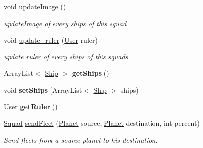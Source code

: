 \begin{DoxyCompactItemize}
\mbox{\label{classfr_1_1groupe40_1_1projet_1_1model_1_1ships_1_1_squad_ae76aa52a5a5892f28e2b5a89ccc98fa6}} 
void \mbox{\hyperlink{classfr_1_1groupe40_1_1projet_1_1model_1_1ships_1_1_squad_ae76aa52a5a5892f28e2b5a89ccc98fa6}{update\+Image}} ()
\begin{DoxyCompactList}\small\item\em update\+Image of every ships of this squad \end{DoxyCompactList}\item 
void \mbox{\hyperlink{classfr_1_1groupe40_1_1projet_1_1model_1_1ships_1_1_squad_adaf147d0fd3649c1bf3172c9fd77f096}{update\+\_\+ruler}} (\mbox{\hyperlink{classfr_1_1groupe40_1_1projet_1_1client_1_1_user}{User}} ruler)
\begin{DoxyCompactList}\small\item\em update ruler of every ships of this squads \end{DoxyCompactList}\item 
\mbox{\label{classfr_1_1groupe40_1_1projet_1_1model_1_1ships_1_1_squad_a1f5eb0f3d75a52d9f9aeb356eedf603f}} 
Array\+List$<$ \mbox{\hyperlink{classfr_1_1groupe40_1_1projet_1_1model_1_1ships_1_1_ship}{Ship}} $>$ {\bfseries get\+Ships} ()
\item 
\mbox{\label{classfr_1_1groupe40_1_1projet_1_1model_1_1ships_1_1_squad_ab3984439f95320352b71008c4fecce60}} 
void {\bfseries set\+Ships} (Array\+List$<$ \mbox{\hyperlink{classfr_1_1groupe40_1_1projet_1_1model_1_1ships_1_1_ship}{Ship}} $>$ ships)
\item 
\mbox{\label{classfr_1_1groupe40_1_1projet_1_1model_1_1ships_1_1_squad_a38e7cd0ba4ab8456d9773028cbdad254}} 
\mbox{\hyperlink{classfr_1_1groupe40_1_1projet_1_1client_1_1_user}{User}} {\bfseries get\+Ruler} ()
\item 
\mbox{\hyperlink{classfr_1_1groupe40_1_1projet_1_1model_1_1ships_1_1_squad}{Squad}} \mbox{\hyperlink{classfr_1_1groupe40_1_1projet_1_1model_1_1ships_1_1_squad_a66e383288a4aa71ee2fc109cfffc12a2}{send\+Fleet}} (\mbox{\hyperlink{classfr_1_1groupe40_1_1projet_1_1model_1_1planets_1_1_planet}{Planet}} source, \mbox{\hyperlink{classfr_1_1groupe40_1_1projet_1_1model_1_1planets_1_1_planet}{Planet}} destination, int percent)
\begin{DoxyCompactList}\small\item\em Send fleets from a source planet to his destination. \end{DoxyCompactList}\end{DoxyCompactItemize}


